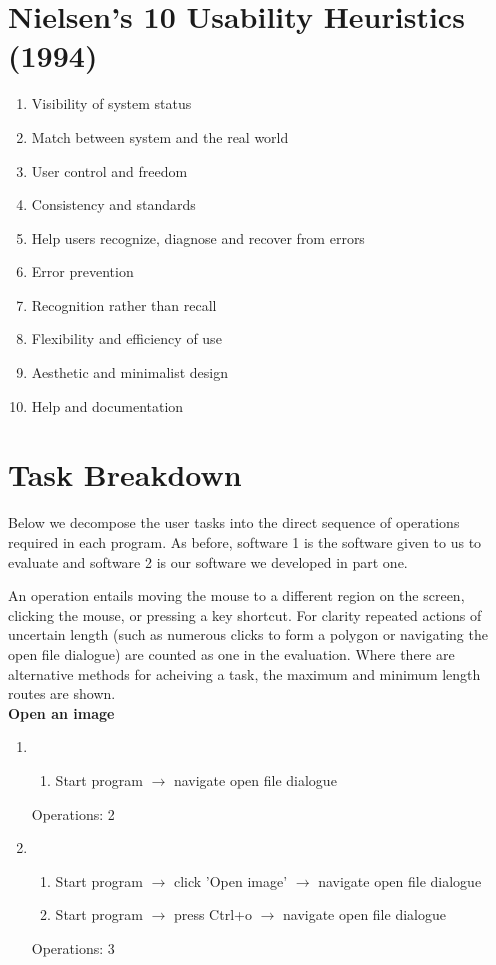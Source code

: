 \documentclass[a4paper,11pt,oneside]{article}
\begin{document}
\section{Nielsen’s 10 Usability Heuristics (1994)}
\label{sec:n_rules}
\begin{enumerate}
    \item Visibility of system status
    \item Match between system and the real world
    \item User control and freedom
    \item Consistency and standards
    \item Help users recognize, diagnose and recover from errors
    \item Error prevention
    \item Recognition rather than recall
    \item Flexibility and efficiency of use
    \item Aesthetic and minimalist design
    \item Help and documentation
\end{enumerate}

\section{Task Breakdown}
\label{sec:task_breakdown}

Below we decompose the user tasks into the direct sequence of operations required in each program. As before, software 1 is the software given to us to evaluate and software 2 is our software we developed in part one.

An operation entails moving the mouse to a different region on the screen, clicking the mouse, or pressing a key shortcut. For clarity repeated actions of uncertain length (such as numerous clicks to form a polygon or navigating the open file dialogue) are counted as one in the evaluation. Where there are alternative methods for acheiving a task, the maximum and minimum length routes are shown.\\

{\bf Open an image}
\begin{enumerate}
    \item
    \begin{enumerate}
        \item Start program $\rightarrow$ navigate open file dialogue
    \end{enumerate}
    Operations: 2
    \item
    \begin{enumerate}
        \item Start program $\rightarrow$ click 'Open image' $\rightarrow$ navigate open file dialogue
        \item Start program $\rightarrow$ press Ctrl+o $\rightarrow$ navigate open file dialogue
    \end{enumerate}
    Operations: 3
\end{enumerate}
\end{document}
